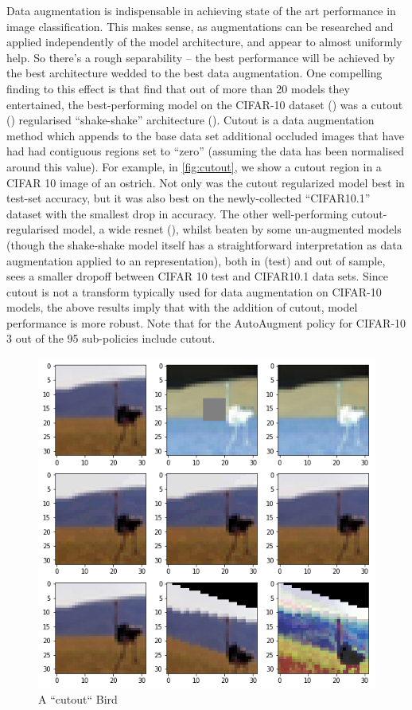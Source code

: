 \documentclass[10pt,twocolumn,letterpaper]{article}
\begin{document}
Data augmentation is indispensable in achieving state of the art performance in image classification. This makes  sense, as augmentations can be researched and applied independently of the model architecture, and appear to almost uniformly help. So there's a rough separability -- the best performance will be achieved by the best architecture wedded to the best data augmentation.  One compelling finding to this effect is that \cite{Recht2018} find that out of more than 20 models they entertained, the best-performing model on the CIFAR-10 dataset (\cite{Krizhevsk2009}) was a cutout (\cite{Devries2017}) regularised ``shake-shake'' architecture (\cite{Gastaldi2017}). Cutout is a data augmentation method which appends to the base data set additional occluded images that have had had contiguous regions set to ``zero'' (assuming the data has been normalised around this value). For example, in \autoref{fig:cutout}, we show a cutout region in a CIFAR 10 image of an ostrich. Not only was the cutout regularized model best in test-set accuracy, but it was also best on the newly-collected ``CIFAR10.1'' dataset with the smallest drop in accuracy. The other well-performing cutout-regularised model, a wide resnet (\cite{Zagoruyko2016}), whilst beaten by some un-augmented models (though the shake-shake model itself has a straightforward interpretation as data augmentation applied to an representation), both in (test) and out of sample, sees a smaller dropoff between CIFAR 10 test and CIFAR10.1 data sets. Since cutout is not a transform typically used for data augmentation on CIFAR-10 models, the above results imply that with the addition of cutout, model performance is more robust. Note that for the AutoAugment policy for CIFAR-10 3 out of the 95 sub-policies include cutout.

\begin{figure}[t]
\begin{center}
   \includegraphics[trim={6.5cm 12.5cm 6.5cm 0}, clip, width=0.8\linewidth]{image.png}
\end{center}
   \caption{A ``cutout`` Bird}
\label{fig:cutout}
\end{figure}
\end{document}

